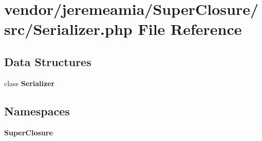 \section{vendor/jeremeamia/\+Super\+Closure/src/\+Serializer.php File Reference}
\label{jeremeamia_2_super_closure_2src_2_serializer_8php}
\subsection*{Data Structures}
\begin{DoxyCompactItemize}
\item 
class {\bf Serializer}
\end{DoxyCompactItemize}
\subsection*{Namespaces}
\begin{DoxyCompactItemize}
\item 
 {\bf Super\+Closure}
\end{DoxyCompactItemize}
